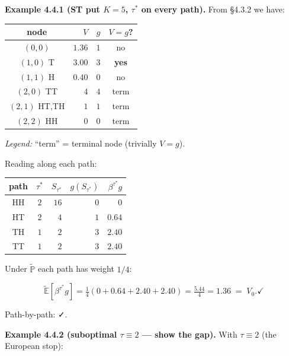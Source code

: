 \documentclass[
  10pt,
  twoside]{book}
\newcounter{none} %
\begin{document}
\textbf{Example 4.4.1 (ST put \(K = 5\), \(\tau^*\) on every path).}
From §4.3.2 we have:

{\def\LTcaptype{none} %
\begin{table}[H]
\centering
\begin{tabular}{|c|r|r|c|}
\toprule
node & \(V\) & \(g\) & \(V = g\)? \\
\midrule



\((0, 0)\) & \(1.36\) & \(1\) & no \\
\((1, 0)\) T & \(3.00\) & \(3\) & \textbf{yes} \\
\((1, 1)\) H & \(0.40\) & \(0\) & no \\
\((2, 0)\) TT & \(4\) & \(4\) & term \\
\((2, 1)\) HT,TH & \(1\) & \(1\) & term \\
\((2, 2)\) HH & \(0\) & \(0\) & term \\
\bottomrule
\end{tabular}
\end{table}
}

\emph{Legend:} ``term'' = terminal node (trivially \(V = g\)).

Reading along each path:

{\def\LTcaptype{none} %
\begin{table}[H]
\centering
\begin{tabular}{|c|c|r|r|r|}
\toprule
path & \(\tau^*\) & \(S_{\tau^*}\) & \(g(S_{\tau^*})\) &
\(\beta^{\tau^*}g\) \\
\midrule



HH & \(2\) & \(16\) & \(0\) & \(0\) \\
HT & \(2\) & \(4\) & \(1\) & \(0.64\) \\
TH & \(1\) & \(2\) & \(3\) & \(2.40\) \\
TT & \(1\) & \(2\) & \(3\) & \(2.40\) \\
\bottomrule
\end{tabular}
\end{table}
}

Under \(\tilde{\mathbb{P}}\) each path has weight \(1/4\):

\[\tilde{\mathbb{E}}[\beta^{\tau^*} g] = \tfrac{1}{4}(0 + 0.64 + 2.40 + 2.40) = \tfrac{5.44}{4} = 1.36 \;=\; V_0. \checkmark\]

Path-by-path: ✓.

\textbf{Example 4.4.2 (suboptimal \(\tau \equiv 2\) --- show the gap).}
With \(\tau \equiv 2\) (the European stop):
\end{document}
